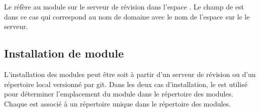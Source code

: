 Le   réfère
au module  sur le serveur de révision 
dans l'espace . Le champ  de est dans ce
cas  qui correspond au nom de domaine avec
le nom de l'espace sur le le serveur.


\subsection{Installation de module}

L'installation des modules peut être soit à partir d'un serveur de révision
ou d'un répertoire local versionné par git. Dans les deux cas d'installation,
le   est utilisé pour déterminer l'emplacement du module
dans le répertoire des modules. Chaque  est associé à un
répertoire unique dans le répertoire des modules.




